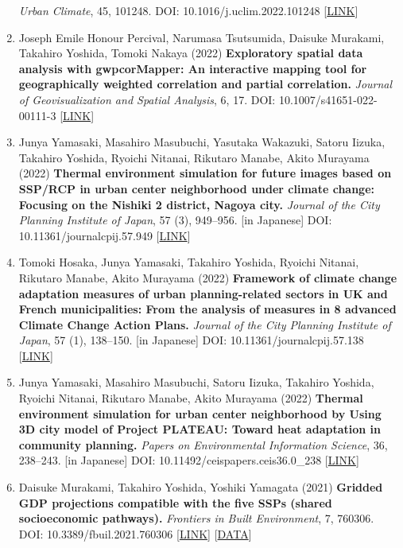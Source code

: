 \documentclass[
]{book}
\begin{document}
\begin{enumerate}
  \emph{Urban Climate}, 45, 101248.
  DOI: 10.1016/j.uclim.2022.101248 {[}\href{https://doi.org/10.1016/j.uclim.2022.101248}{LINK}{]}
\item
  Joseph Emile Honour Percival, Narumasa Tsutsumida, Daisuke Murakami, Takahiro Yoshida, Tomoki Nakaya (2022)
  \textbf{Exploratory spatial data analysis with gwpcorMapper: An interactive mapping tool for geographically weighted correlation and partial correlation.}
  \emph{Journal of Geovisualization and Spatial Analysis}, 6, 17.
  DOI: 10.1007/s41651-022-00111-3 {[}\href{https://link.springer.com/article/10.1007/s41651-022-00111-3}{LINK}{]}
\item
  Junya Yamasaki, Masahiro Masubuchi, Yasutaka Wakazuki, Satoru Iizuka, Takahiro Yoshida, Ryoichi Nitanai, Rikutaro Manabe, Akito Murayama (2022)
  \textbf{Thermal environment simulation for future images based on SSP/RCP in urban center neighborhood under climate change: Focusing on the Nishiki 2 district, Nagoya city.}
  \emph{Journal of the City Planning Institute of Japan}, 57 (3), 949--956. {[}in Japanese{]}
  DOI: 10.11361/journalcpij.57.949 {[}\href{https://doi.org/10.11361/journalcpij.57.949}{LINK}{]}
\item
  Tomoki Hosaka, Junya Yamasaki, Takahiro Yoshida, Ryoichi Nitanai, Rikutaro Manabe, Akito Murayama (2022)
  \textbf{Framework of climate change adaptation measures of urban planning-related sectors in UK and French municipalities: From the analysis of measures in 8 advanced Climate Change Action Plans.}
  \emph{Journal of the City Planning Institute of Japan}, 57 (1), 138--150. {[}in Japanese{]}
  DOI: 10.11361/journalcpij.57.138 {[}\href{https://doi.org/10.11361/journalcpij.57.138}{LINK}{]}
\item
  Junya Yamasaki, Masahiro Masubuchi, Satoru Iizuka, Takahiro Yoshida, Ryoichi Nitanai, Rikutaro Manabe, Akito Murayama (2022)
  \textbf{Thermal environment simulation for urban center neighborhood by Using 3D city model of Project PLATEAU: Toward heat adaptation in community planning.}
  \emph{Papers on Environmental Information Science}, 36, 238--243. {[}in Japanese{]}
  DOI: 10.11492/ceispapers.ceis36.0\_238 {[}\href{https://doi.org/10.11492/ceispapers.ceis36.0_238}{LINK}{]}
\item
  Daisuke Murakami, Takahiro Yoshida, Yoshiki Yamagata (2021)
  \textbf{Gridded GDP projections compatible with the five SSPs (shared socioeconomic pathways).}
  \emph{Frontiers in Built Environment}, 7, 760306.
  DOI: 10.3389/fbuil.2021.760306 {[}\href{https://www.frontiersin.org/articles/10.3389/fbuil.2021.760306/abstract}{LINK}{]} {[}\href{https://figshare.com/articles/dataset/Gridded_GDP_projections_compatible_with_the_five_SSPs_Shared_Socioeconomic_Pathways_/12016506/1}{DATA}{]}

\end{enumerate}
\end{document}
